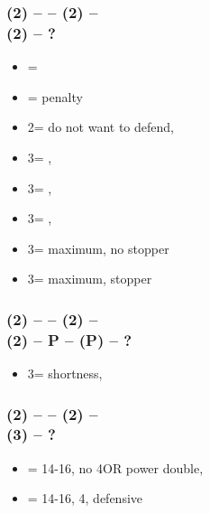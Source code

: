 \subsubsection*{(2\diams) -- \dbl -- (2\hearts) -- \dbl \\
                (2\spades) -- ?}        
\begin{itemize}
    \item \pass = \fonce
    \item \dbl = penalty
    \item 2\nt = do not want to defend, \gf
    \item 3\clubs = \nat, \gf
    \item 3\diams = \nat, \gf
    \item 3\hearts = \nat, \gf
    \item 3\spades = maximum, no \spades stopper
    \item 3\nt = maximum, stopper
\end{itemize}

\subsubsection*{(2\diams) -- \dbl -- (2\hearts) -- \dbl \\
                (2\spades) -- P -- (P) -- ?}
\begin{itemize}
    \item 3\spades = \spades shortness, \gf %
\end{itemize}

\subsubsection*{(2\diams) -- \dbl -- (2\spades) -- \dbl \\
                (3\hearts) -- ?}  
\begin{itemize}
    \item \pass = 14-16, no 4\spades OR power double, \fonce
    \item \dbl = 14-16, 4\spades, defensive
    
\end{itemize}


